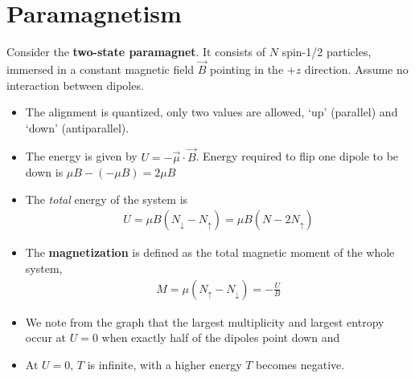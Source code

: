\documentclass{book}
\begin{document}
\section{Paramagnetism}%
\label{sec:paramagnetism}

Consider the \textbf{two-state paramagnet}. It consists of $ N $ spin-1/2 particles, immersed in a constant
magnetic field $ \vec{B} $ pointing in the $ +z $ direction. Assume no interaction between dipoles.
\begin{itemize}
	\item The alignment is quantized, only two values are allowed, `up' (parallel) and `down' (antiparallel).
	\item The energy is given by $ U = - \vec{\mu} \cdot \vec{B} $. Energy required to flip one dipole to be
				down is $ \mu B - (-\mu B) = 2\mu B $
  \item The \textit{total} energy of the system is
				\begin{align}
					U = \mu B  (N_\downarrow - N_\uparrow)= \mu B(N - 2N_{\uparrow})
				\end{align}
  \item The \textbf{magnetization} is defined as the total magnetic moment of the whole system,
				\begin{align}
					M = \mu (N_\uparrow - N_\downarrow) = - \frac{U}{B}
				\end{align}
  \item We note from the graph that the largest multiplicity and largest entropy occur at $ U = 0 $ when exactly
				half of the dipoles point down and

	\item At $ U = 0 $,	$ T $ is infinite, with a higher energy $ T $ becomes negative. 

				




\end{itemize}
\end{document}
